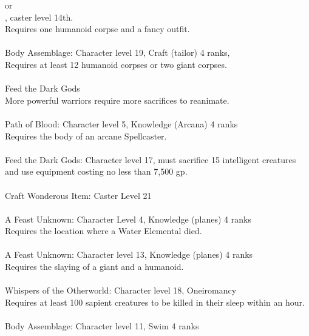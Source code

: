 \begin{multicols}{2}
\begin{small}
or\\
, caster level 14th.\\
Requires one humanoid corpse and a fancy outfit.\\
\\
Body Assemblage: Character level 19, Craft (tailor) 4 ranks,\\
Requires at least 12 humanoid corpses or two giant corpses.\\
\\
Feed the Dark Gods\\
More powerful warriors require more sacrifices to reanimate.\\
\\
Path of Blood: Character level 5, Knowledge (Arcana) 4 ranks\\
Requires the body of an arcane Spellcaster.\\
\\
Feed the Dark Gods: Character level 17, must sacrifice 15 intelligent creatures and use equipment costing no less than 7,500 gp.\\
\\
Craft Wonderous Item: Caster Level 21\\
\\
A Feast Unknown: Character Level 4, Knowledge (planes) 4 ranks\\
Requires the location where a Water Elemental died.\\
\\
A Feast Unknown: Character level 13, Knowledge (planes) 4 ranks\\
Requires the slaying of a giant and a humanoid.\\
\\
Whispers of the Otherworld: Character level 18, Oneiromancy\\
Requires at least 100 sapient creatures to be killed in their sleep within an hour.\\
\\
Body Assemblage: Character level 11, Swim 4 ranks\\

\end{small}
\end{multicols}
